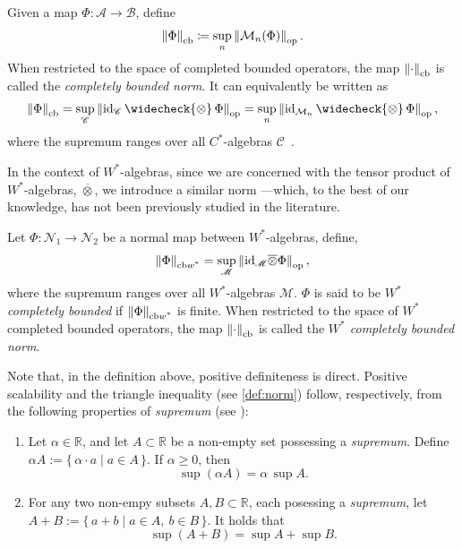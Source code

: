 \begin{definition} \label{def:cb_norm}
Given a map \( \Phi \colon \mathscr{A} \to \mathscr{B} \), define
\[
\left\lVert \Phi \right\rVert_{\text{cb}} \coloneqq \sup_{n} \left\lVert \mathcal{M}_{n}(\Phi) \right\rVert_{\text{op}}.
\]
When restricted to the space of completed bounded operators, the map \( \left\lVert \cdot \right\rVert_{\text{cb}} \) is called the \emph{completely bounded norm}.  
It can equivalently be written as
\[
\cbnorm{\Phi} = \sup_{\mathscr{C}} \opnorm{\id_{\mathscr{C}} \,\widecheck{\otimes}\, \Phi} 
= \sup_{n} \opnorm{\id_{\SqMatrix{n}} \,\widecheck{\otimes}\, \Phi},
\]
where the supremum ranges over all \( C^* \)-algebras \( \mathscr{C} \)~\cite[Introduction, p.~4]{pisierTensorProductsCAlgebras2020}. 
\end{definition} 

In the context of $W^*$-algebras, since we are concerned with the tensor product of $W^*$-algebras, $\overline{\otimes}$, we introduce a similar norm
---which, to the best of our knowledge, has not been previously studied in the literature.
\begin{definition} \label{def:wcb_nor}
  Let $\Phi:\mathscr{N}_1 \to \mathscr{N}_2$ be a normal map between $W^*$-algebras, define,
  \[ \left\lVert \Phi \right\rVert_{\text{cb$w^*$}} = \sup_{\mathscr{M}} \left\lVert \mathrm{id}_{\mathscr{M}} \overline{\otimes} \Phi \right\rVert_{\text{op}}, \]
where the supremum ranges over all $W^*$-algebras \( \mathscr{M} \). $\Phi$ is said to be \emph{$W^*$ completely bounded} if $\left\lVert \Phi \right\rVert_{\text{cb$w^*$}}$ is finite.
When restricted to the space of $W^*$ completed bounded operators, the map \( \left\lVert \cdot \right\rVert_{\text{cb}} \) is called the \emph{$W^*$ completely bounded norm}.
\end{definition}


Note that, in the definition above, positive definiteness is direct. 
Positive scalability and the triangle inequality (see \autoref{def:norm}) 
follow, respectively, from the following properties of \emph{supremum} (see \cite[Chapter 2, Section 8-9]{zakon2011mathematical}):
\begin{enumerate}
  \item Let \( \alpha \in \mathbb{R} \), and let \( A \subset \mathbb{R} \) be a non-empty set possessing a \emph{supremum}. Define \(\alpha A := \{\, \alpha \cdot a \mid a \in A \,\}
\).
If $\alpha \geq 0$, then
\[
\sup(\alpha A) = \alpha \, \sup A.
\]
 \item For any two non-empy subsets $A, B \subset \mathbb{R}$, each posessing a \emph{supremum},  
let 
\(
A + B := \{\, a + b \mid a \in A, \ b \in B \,\}.
\)
It holds that
\[
\sup(A + B) = \sup A + \sup B .
\]
\end{enumerate}


